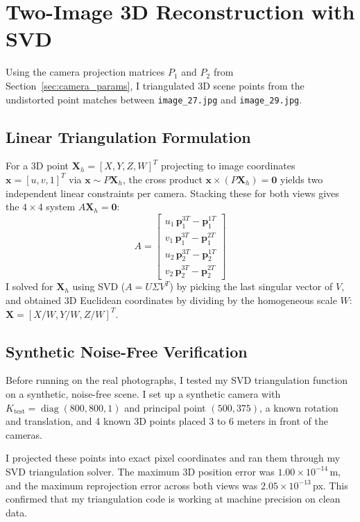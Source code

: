\documentclass[12pt]{article}
\begin{document}
\section{Two-Image 3D Reconstruction with SVD}\label{sec:svd_reconstruction}

Using the camera projection matrices $P_1$ and $P_2$ from Section~\ref{sec:camera_params}, I triangulated 3D scene points from the undistorted point matches between \texttt{image\_27.jpg} and \texttt{image\_29.jpg}. 

\subsection{Linear Triangulation Formulation}
For a 3D point $\mathbf{X}_h = [X, Y, Z, W]^T$ projecting to image coordinates $\mathbf{x} = [u, v, 1]^T$ via $\mathbf{x} \sim P \mathbf{X}_h$, the cross product $\mathbf{x} \times (P \mathbf{X}_h) = \mathbf{0}$ yields two independent linear constraints per camera. Stacking these for both views gives the $4 \times 4$ system $A \mathbf{X}_h = \mathbf{0}$:
\begin{equation}
A = \begin{bmatrix}
u_1 \, \mathbf{p}_1^{3T} - \mathbf{p}_1^{1T} \\
v_1 \, \mathbf{p}_1^{3T} - \mathbf{p}_1^{2T} \\
u_2 \, \mathbf{p}_2^{3T} - \mathbf{p}_2^{1T} \\
v_2 \, \mathbf{p}_2^{3T} - \mathbf{p}_2^{2T}
\end{bmatrix}
\label{eq:triangulation_matrix}
\end{equation}
I solved for $\mathbf{X}_h$ using SVD ($A = U \Sigma V^T$) by picking the last singular vector of $V$, and obtained 3D Euclidean coordinates by dividing by the homogeneous scale $W$: $\mathbf{X} = [X/W, Y/W, Z/W]^T$.

\subsection{Synthetic Noise-Free Verification}
Before running on the real photographs, I tested my SVD triangulation function on a synthetic, noise-free scene. I set up a synthetic camera with $K_{\text{test}} = \operatorname{diag}(800, 800, 1)$ and principal point $(500, 375)$, a known rotation and translation, and 4 known 3D points placed 3 to 6 meters in front of the cameras.

I projected these points into exact pixel coordinates and ran them through my SVD triangulation solver. The maximum 3D position error was $1.00 \times 10^{-14}$\,m, and the maximum reprojection error across both views was $2.05 \times 10^{-13}$\,px. This confirmed that my triangulation code is working at machine precision on clean data.
\end{document}
